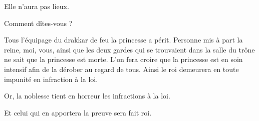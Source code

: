 \begin{drama}
  \elenaspeaks Elle n’aura pas lieux.

  \generalspeaks Comment dîtes-vous ?

  \elenaspeaks Tous l’équipage du drakkar de feu la princesse \princesse{} a périt. Personne mis à part la reine, moi, vous, ainsi que les deux gardes qui se trouvaient dans la salle du trône ne sait que la princesse est morte. L’on fera croire que la princesse est en soin intensif afin de la dérober au regard de tous. Ainsi le roi demeurera en toute impunité en infraction à la loi.

  \generalspeaks Or, la noblesse tient en horreur les infractions à la loi.

  \elenaspeaks Et celui qui en apportera la preuve sera fait roi.
\end{drama}

\scene

\StageDirII{\general, \nobleOne, \nobleTwo, \nobleTree}


